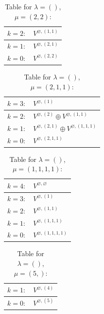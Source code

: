 \documentclass[a4paper,12pt]{article}
\begin{document}
\renewcommand{\arraystretch}{1.6} 
\begin{table}[H]
\centering
\caption{Table for $\lambda = ()$, $\mu = (2, 2)$:}
\begin{tabular}{|>{\centering\arraybackslash}p{15cm}|}
\hline
 $k = 2: \quad V^{\varnothing, (1, 1)} $ \\ \hline
 $k = 1: \quad V^{\varnothing, (2, 1)} $ \\ \hline
 $k = 0: \quad V^{\varnothing, (2, 2)} $ \\ \hline
\end{tabular}
\end{table}

\renewcommand{\arraystretch}{1.6} 
\begin{table}[H]
\centering
\caption{Table for $\lambda = ()$, $\mu = (2, 1, 1)$:}
\begin{tabular}{|>{\centering\arraybackslash}p{15cm}|}
\hline
 $k = 3: \quad V^{\varnothing, (1)} $ \\ \hline
 $k = 2: \quad V^{\varnothing, (2)} \oplus V^{\varnothing, (1, 1)} $ \\ \hline
 $k = 1: \quad V^{\varnothing, (2, 1)} \oplus V^{\varnothing, (1, 1, 1)} $ \\ \hline
 $k = 0: \quad V^{\varnothing, (2, 1, 1)} $ \\ \hline
\end{tabular}
\end{table}

\renewcommand{\arraystretch}{1.6} 
\begin{table}[H]
\centering
\caption{Table for $\lambda = ()$, $\mu = (1, 1, 1, 1)$:}
\begin{tabular}{|>{\centering\arraybackslash}p{15cm}|}
\hline
 $k = 4: \quad V^{\varnothing, \varnothing} $ \\ \hline
 $k = 3: \quad V^{\varnothing, (1)} $ \\ \hline
 $k = 2: \quad V^{\varnothing, (1, 1)} $ \\ \hline
 $k = 1: \quad V^{\varnothing, (1, 1, 1)} $ \\ \hline
 $k = 0: \quad V^{\varnothing, (1, 1, 1, 1)} $ \\ \hline
\end{tabular}
\end{table}

\renewcommand{\arraystretch}{1.6} 
\begin{table}[H]
\centering
\caption{Table for $\lambda = ()$, $\mu = (5,)$:}
\begin{tabular}{|>{\centering\arraybackslash}p{15cm}|}
\hline
 $k = 1: \quad V^{\varnothing, (4)} $ \\ \hline
 $k = 0: \quad V^{\varnothing, (5)} $ \\ \hline
\end{tabular}
\end{table}
\end{document}
